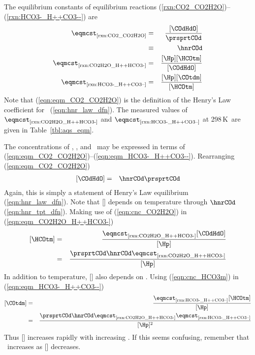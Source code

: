 \documentclass[12pt,twoside]{book}
\newcounter{reaction} %
\begin{document}
The equilibrium constants of equilibrium reactions
(\ref{rxn:CO2_CO2H2O})--(\ref{rxn:HCO3-_H++CO3--}) are
\begin{eqnarray}
\label{eqn:eqm_CO2_CO2H2O}
\eqmcst_{\mbox{\scriptsize \ref{rxn:CO2_CO2H2O}}} & = & \frac{[\COdHdO]}{\prsprtCOd } \\ %
& \equiv & \hnrCOd \nonumber \\
\label{eqn:eqm_CO2H2O_H++HCO3-}
\eqmcst_{\mbox{\scriptsize \ref{rxn:CO2H2O_H++HCO3-}}} & = & \frac{[\Hp] [\HCOtm]}{[\COdHdO] } \\ %
\label{eqn:eqm_HCO3-_H++CO3--}
\eqmcst_{\mbox{\scriptsize \ref{rxn:HCO3-_H++CO3--}}} & = & \frac{[\Hp] [\COtdm] }{
[\HCOtm] } %
\end{eqnarray}
Note that (\ref{eqn:eqm_CO2_CO2H2O}) is the definition of the Henry's
Law coefficient for \COd\ (\ref{eqn:hnr_law_dfn}).
The measured values of $\eqmcst_{\mbox{\scriptsize \ref{rxn:CO2H2O_H++HCO3-}}}$ and
$\eqmcst_{\mbox{\scriptsize \ref{rxn:HCO3-_H++CO3--}}}$ at 298\,K\ are given in
Table~\ref{tbl:aqs_eqm}. 

The concentrations of \COdHdO, \HCOtm, and \COtdm\ may be expressed in
terms of (\ref{eqn:eqm_CO2_CO2H2O})--(\ref{eqn:eqm_HCO3-_H++CO3--}).
Rearranging (\ref{eqn:eqm_CO2_CO2H2O})
\begin{eqnarray}
\label{eqn:cnc_CO2H2O}
[\COdHdO] & = & \hnrCOd \prsprtCOd %
\end{eqnarray}
Again, this is simply a statement of Henry's Law equilibrium
(\ref{eqn:hnr_law_dfn}). 
Note that [\COdHdO] depends on temperature through $\hnrCOd$
(\ref{eqn:hnr_tpt_dfn}). 
Making use of (\ref{eqn:cnc_CO2H2O}) in (\ref{eqn:eqm_CO2H2O_H++HCO3-})
\begin{eqnarray}
\label{eqn:cnc_HCO3m}
[\HCOtm] & = & \frac{\eqmcst_{\mbox{\scriptsize \ref{rxn:CO2H2O_H++HCO3-}}} [\COdHdO]}{[\Hp] } \nonumber \\
& = & \frac{\prsprtCOd \hnrCOd \eqmcst_{\mbox{\scriptsize \ref{rxn:CO2H2O_H++HCO3-}}}}{[\Hp] } %
\end{eqnarray}
In addition to temperature, [\HCOtm] also depends on \pH\@.
Using (\ref{eqn:cnc_HCO3m}) in (\ref{eqn:eqm_HCO3-_H++CO3--}) 
\begin{eqnarray}
\label{eqn:cnc_CO3dm}
[\COtdm] & = & \frac{\eqmcst_{\mbox{\scriptsize \ref{rxn:HCO3-_H++CO3--}}} [\HCOtm]}{[\Hp] } \nonumber \\ %
& = & \frac{\prsprtCOd \hnrCOd \eqmcst_{\mbox{\scriptsize \ref{rxn:CO2H2O_H++HCO3-}}} \eqmcst_{\mbox{\scriptsize \ref{rxn:HCO3-_H++CO3--}}}}{[\Hp]^{2} } %
\end{eqnarray}
Thus [\COtdm] increases rapidly with increasing \pH\@.
If this seems confusing, remember that \pH\ increases as [\Hp]
decreases. 
\end{document}
